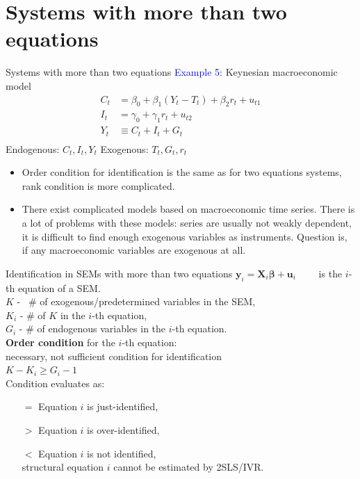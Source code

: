 \documentclass[usenames,dvipsnames]{beamer}
\begin{document}
\section{Systems with more than two equations}
\begin{frame}{Systems with more than two equations}
\textcolor{Blue}{Example 5:} Keynesian macroeconomic model
\vspace{0.2cm}
\begin{align*}
C_t & = \beta_0 + \beta_1(Y_t - T_t) + \beta_2 r_t + u_{t1} \\
I_t & = \gamma_0 + \gamma_1 r_t + u_{t2} \\
Y_t & \equiv C_t + I_t + G_t \\
\end{align*}
\vspace{-0.2cm}
\noindent Endogenous: $C_t, I_t, Y_t$ \hfill Exogenous: $T_t, G_t, r_t $ \\ 
\medskip
\begin{itemize}
\item Order condition for identification is the same as for two equations systems, rank condition is more complicated. 
\item There exist complicated models based on macroeconomic time series. There is a lot of problems with these models: series are usually not weakly dependent, it is difficult to find enough exogenous variables as instruments. Question is, if any macroeconomic variables are exogenous at all.
\end{itemize}
\end{frame}
\begin{frame}{Identification in SEMs with more than two equations}
$\bm{y}_i = \bm{X}_i \bm{\beta}  + \bm{u}_i \qquad$ is the $i$-th equation of a SEM.\\
\medskip
$K$ - ~\# of exogenous/predetermined variables in the SEM,\\ 
$K_i$ - \# of $K$ in the $i$-th equation,\\
$G_i$ - \# of endogenous variables in the $i$-th equation.\\
\bigskip
\textbf{Order condition} for the $i$-th equation:\\
necessary, not sufficient condition for identification\\
\bigskip
$K-K_i \geq G_i -1$\\
\bigskip
Condition evaluates as:
\begin{itemize}
\item[$=$] Equation $i$ is just-identified,
\item[$>$] Equation $i$ is over-identified,
\item[$<$] Equation $i$ is  not identified,\\
structural equation $i$ cannot be estimated by 2SLS/IVR.
\end{itemize}
\end{frame}
\end{document}
